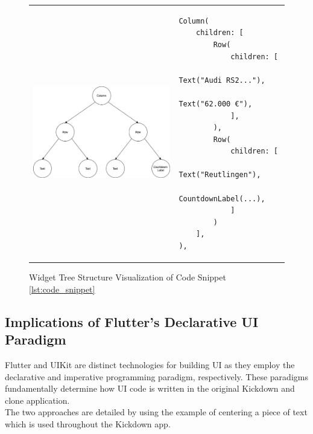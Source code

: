 \begin{figure}[htbp]
    \begin{tabular}{p{}p{}}
        \begin{minipage}{.55\textwidth}
        \centering
        \includegraphics[width=\linewidth]{images/Kickdown_overview_info_ui_tree.eps}
        \caption{Widget Tree Structure Visualization of Code Snippet \ref{lst:code_snippet}}
        \label{fig:kickdown_overview_info_ui_tree}
        \end{minipage}
        &
        \begin{minipage}{.45\textwidth}
            \begin{lstlisting}[caption={Simplified Flutter Code for UI Layout shown in Fig. \ref{fig:kickdown_overview_info_ui}},label={lst:code_snippet}]
Column(
    children: [
        Row(
            children: [
                Text("Audi RS2..."),
                Text("62.000 €"),
            ],
        ),
        Row(
            children: [
                Text("Reutlingen"),
                CountdownLabel(...),
            ]
        )
    ],
),
            \end{lstlisting}
        \end{minipage}
    \end{tabular}
\end{figure}

\subsection{Implications of Flutter's Declarative UI Paradigm} \label{section::declarative_vs_imperative_ui}
Flutter and UIKit are distinct technologies for building UI as they employ the declarative and imperative programming paradigm, respectively. 
These paradigms fundamentally determine how UI code is written in the  original Kickdown and clone application.\\
The two approaches are detailed by using the example of centering a piece of text which is used throughout the Kickdown app.

